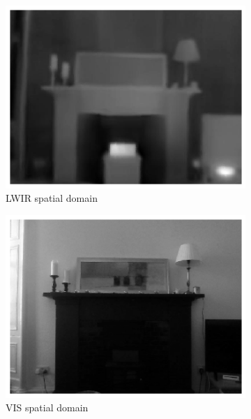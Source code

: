 \documentclass{l4proj}
\begin{document}
\begin{figure}[ht]
  \centering
  \begin{subfigure}[h!]{0.4\textwidth}
    \includegraphics[width=\textwidth]{images/fourier/lwir_spatial}
    \caption{LWIR spatial domain}
    \label{fig:fourier_lwir_spatial}
  \end{subfigure}
  \begin{subfigure}[h!]{0.4\textwidth}
    \includegraphics[width=\textwidth]{images/fourier/gray_spatial}
    \caption{VIS spatial domain}
    \label{fig:fourier_vis_spatial}
  \end{subfigure}
  \begin{subfigure}[h!]{0.4\textwidth}

\end{subfigure}
\end{figure}
\end{document}
